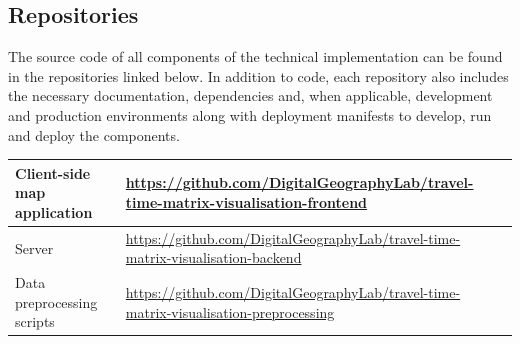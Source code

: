 \begin{appendices}
\subsection{Repositories}
\label{appendix:repositories}

The source code of all components of the technical implementation
can be found in the repositories linked below.
In addition to code, each repository also includes
the necessary documentation,
dependencies and, when applicable,
development and production environments along with deployment manifests
to develop, run and deploy the components.

\begin{table}[H]
	\centering
	\begin{tabular}{ | L{0.38\textwidth} | L{0.62\textwidth} | }
		\hline
		Client-side map application
		& \url{https://github.com/DigitalGeographyLab/travel-time-matrix-visualisation-frontend}
		\\
		\hline
		Server
		& \url{https://github.com/DigitalGeographyLab/travel-time-matrix-visualisation-backend}
		\\
		\hline
		Data preprocessing scripts
		& \url{https://github.com/DigitalGeographyLab/travel-time-matrix-visualisation-preprocessing}
		\\
		\hline
	\end{tabular}
\end{table}

\end{appendices}
